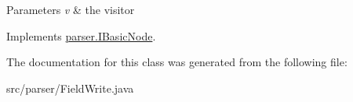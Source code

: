 \begin{DoxyParams}{Parameters}
{\em v} & the visitor \\
\hline
\end{DoxyParams}


Implements \hyperlink{interfaceparser_1_1_i_basic_node_af8790b7076c59e00781ba3d4118757cd}{parser.\+I\+Basic\+Node}.



The documentation for this class was generated from the following file\+:\begin{DoxyCompactItemize}
\item 
src/parser/Field\+Write.\+java\end{DoxyCompactItemize}
